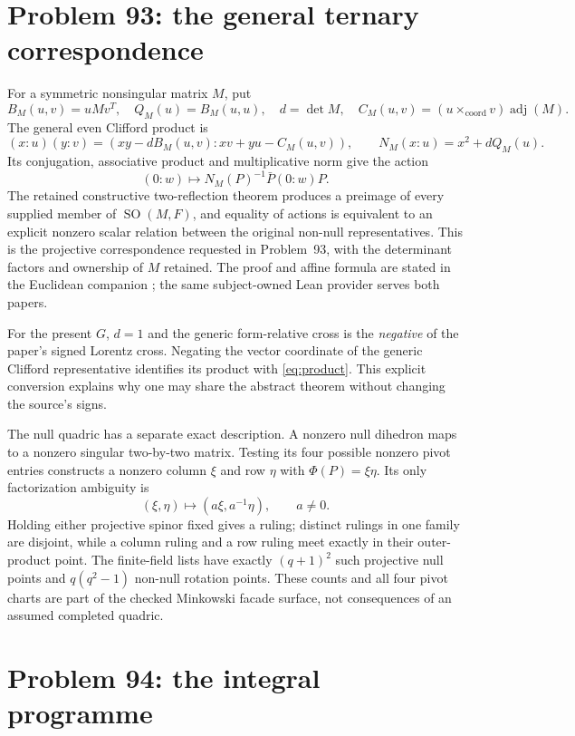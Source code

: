 \documentclass[11pt]{article}
\newcommand{\SO}{\operatorname{SO}}
\newcommand{\adj}{\operatorname{adj}}
\theoremstyle{remark}
\begin{document}
\section{Problem 93: the general ternary correspondence}

For a symmetric nonsingular matrix \(M\), put
\[
 B_M(u,v)=uMv^T,\quad Q_M(u)=B_M(u,u),\quad d=\det M,
 \quad C_M(u,v)=(u\times_{\mathrm{coord}}v)\adj(M).
\]
The general even Clifford product is
\[
 (x:u)(y:v)=(xy-dB_M(u,v):xv+yu-C_M(u,v)),
 \qquad N_M(x:u)=x^2+dQ_M(u).
\]
Its conjugation, associative product and multiplicative norm give the
action
\[
 (0:w)\longmapsto N_M(P)^{-1}\bar P(0:w)P.
\]
The retained constructive two-reflection theorem produces a preimage of
every supplied member of \(\SO(M,F)\), and equality of actions is equivalent
to an explicit nonzero scalar relation between the original non-null
representatives. This is the projective correspondence requested in
Problem~93, with the determinant factors and ownership of \(M\) retained.
The proof and affine formula are stated in the Euclidean companion
\cite{companion}; the same subject-owned Lean provider serves both papers.

For the present \(G\), \(d=1\) and the generic form-relative cross is the
\emph{negative} of the paper's signed Lorentz cross. Negating the vector
coordinate of the generic Clifford representative identifies its product
with \eqref{eq:product}. This explicit conversion explains why one may
share the abstract theorem without changing the source's signs.

The null quadric has a separate exact description. A nonzero null dihedron
maps to a nonzero singular two-by-two matrix. Testing its four possible
nonzero pivot entries constructs a nonzero column \(\xi\) and row \(\eta\)
with \(\Phi(P)=\xi\eta\). Its only factorization ambiguity is
\[
 (\xi,\eta)\longmapsto(a\xi,a^{-1}\eta),\qquad a\ne0.
\]
Holding either projective spinor fixed gives a ruling; distinct rulings in
one family are disjoint, while a column ruling and a row ruling meet exactly
in their outer-product point. The finite-field lists have exactly
\((q+1)^2\) such projective null points and \(q(q^2-1)\) non-null rotation
points. These counts and all four pivot charts are part of the checked
Minkowski facade surface, not consequences of an assumed completed quadric.

\section{Problem 94: the integral programme}
\end{document}
